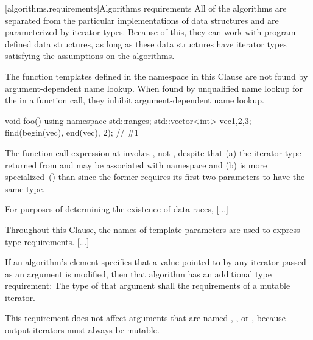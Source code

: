 [algorithms.requirements]{Algorithms requirements}
\pnum
All of the algorithms are separated from the particular implementations of data structures and are
parameterized by iterator types.
Because of this, they can work with program-defined data structures, as long
as these data structures have iterator types satisfying the assumptions on the algorithms.

\begin{addedblock}
{\color{newclr}
\pnum
The function templates defined in the  namespace
in this Clause are not found by argument-dependent
name lookup. When found by
unqualified name lookup for the
 in a function call, they
inhibit argument-dependent name lookup.

\begin{example}
\begin{codeblock}
void foo() {
    using namespace std::ranges;
    std::vector<int> vec{1,2,3};
    find(begin(vec), end(vec), 2); // \#1
}
\end{codeblock}
The function call expression at  invokes ,
not , despite that (a) the iterator type returned from 
and  may be associated with namespace  and (b)
 is more specialized~() than
 since the former requires its first two parameters to
have the same type.
\end{example}
} %
\end{addedblock}

\pnum
For purposes of determining the existence of data races, [...]

\pnum
Throughout this Clause, 
the names of template parameters are used to express type requirements. [...]

\pnum
If an algorithm's
\effects
element specifies that a value pointed to by any iterator passed
as an argument is modified, then that algorithm has an additional
type requirement:
The type of that argument shall   the requirements
of a mutable iterator.
\begin{note}
This requirement does not affect arguments that are named
,
,
or
,
because output iterators must always be mutable.
\end{note}

